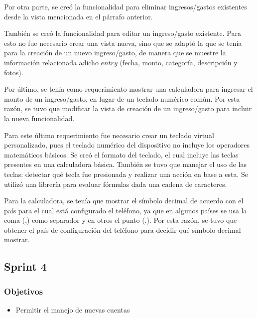 Por otra parte, se creó la funcionalidad para eliminar ingresos/gastos existentes desde la vista mencionada en el párrafo anterior.

También se creó la funcionalidad para editar un ingreso/gasto existente. Para esto no fue necesario crear una vista nueva, sino que se adaptó la que se tenía para la creación de un nuevo ingreso/gasto, de manera que se muestre la información relacionada adicho $entry$ (fecha, monto, categoría, descripción y fotos).

Por último, se tenía como requerimiento mostrar una calculadora para ingresar el monto de un ingreso/gasto, en lugar de un teclado numérico común. Por esta razón, se tuvo que modificar la vista de creación de un ingreso/gasto para incluir la nueva funcionalidad. 

Para este último requerimiento fue necesario crear un teclado virtual personalizado, pues el teclado numérico del dispositivo no incluye los operadores matemáticos básicos. Se creó el formato del teclado, el cual incluye las teclas presentes en una calculadora básica. También se tuvo que manejar el uso de las teclas: detectar qué tecla fue presionada y realizar una acción en base a esta. Se utilizó una librería para evaluar fórmulas dada una cadena de caracteres.

Para la calculadora, se tenía que mostrar el símbolo decimal de acuerdo con el país para el cual está configurado el teléfono, ya que en algunos países se usa la coma (,) como separador y en otros el punto (.). Por esta razón, se tuvo que obtener el país de configuración del teléfono para decidir qué símbolo decimal mostrar.



\subsection{Sprint 4}
\subsubsection{Objetivos}
\begin{itemize}
\item Permitir el manejo de nuevas cuentas
\end{itemize}

